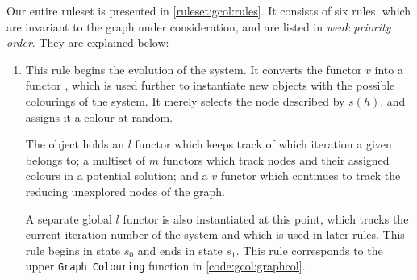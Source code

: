 Our entire ruleset is presented in \autoref{ruleset:gcol:rules}.  It consists of six rules, which are invariant to the graph under consideration, and are listed in \emph{weak priority order}.  They are explained below:

\begin{enumerate}
\item This rule begins the evolution of the system.  It converts the functor \(v\) into a functor \bo{}, which is used further to instantiate new objects with the possible colourings of the system.  It merely selects the node described by \(s(h)\), and assigns it a colour at random.

The \bo{} object holds an \(l\) functor which keeps track of which iteration a given \bo{} belongs to; a multiset of \(m\) functors which track nodes and their assigned colours in a potential solution; and a \(v\) functor which continues to track the reducing unexplored nodes of the graph.


A separate global \(l\) functor is also instantiated at this point, which tracks the current iteration number of the system and which is used in later rules.  This rule begins in state \(s_0\) and ends in state \(s_1\).  This rule corresponds to the upper \texttt{Graph Colouring} function in \autoref{code:gcol:graphcol}.



\end{enumerate}
